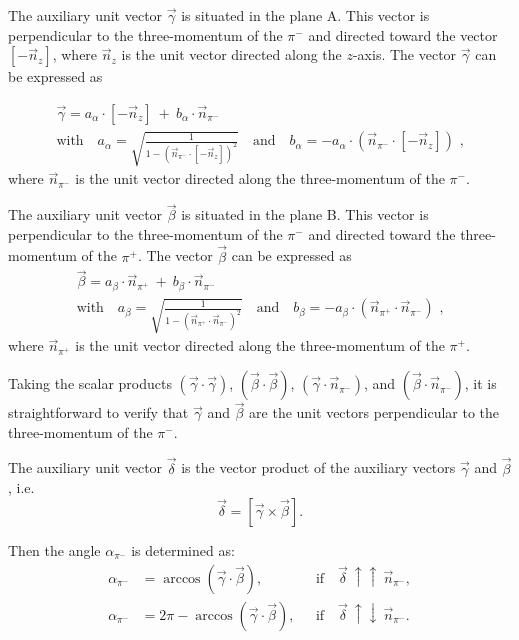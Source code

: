 The auxiliary unit vector $\vec \gamma$ is situated in the plane A. This vector is perpendicular to the three-momentum of the $\pi^{-}$ and directed toward the vector $[-\vec n_{z}]$, where $\vec n_{z}$ is the unit vector directed along the $z$-axis. The vector $\vec \gamma$ can be expressed as

\begin{gather*}
\vec \gamma = a_{\alpha}\cdot[-\vec n_{z}]~+~b_{\alpha}\cdot\vec n_{\pi^{-}}  \nonumber \\[10pt]
\text{with~~~}a_{\alpha}  =\sqrt{\frac{1}{1 - (\vec n_{\pi^{-}} \cdot [-\vec n_{z}] )^{2}}}  \text{~~~and~~~} \label{alphavec}
b_{\alpha}  = -  a_{\alpha}\cdot \left (\vec n_{\pi^{-}} \cdot [-\vec n_{z}] \right) \textrm{ ,} \nonumber
\end{gather*}
where $\vec n_{\pi^{-}}$ is the unit vector directed along the three-momentum of the $\pi^{-}$. 



The auxiliary unit vector $\vec \beta$ is situated in the plane B. This vector is perpendicular to the three-momentum of the $\pi^{-}$ and directed toward the three-momentum of the $\pi^{+}$. The vector $\vec \beta$ can be expressed as
\begin{gather*}
\vec \beta = a_{\beta}\cdot\vec n_{\pi^{+}}~+~b_{\beta}\cdot\vec n_{\pi^{-}}  \nonumber \\[10pt]  
\text{with~~~}a_{\beta} = \sqrt{\frac{1}{1 - (\vec n_{\pi^{+}} \cdot \vec n_{\pi^{-}})^{2}}} \text{~~~and~~~} \label{betavec}
b_{\beta} = -  a_{\beta}\cdot(\vec n_{\pi^{+}} \cdot \vec n_{\pi^{-}}) \textrm{ ,} \nonumber
\end{gather*} 
where $\vec n_{\pi^{+}}$ is the unit vector directed along the three-momentum of the $\pi^{+}$. 

Taking the scalar products $(\vec \gamma \cdot \vec  \gamma)$, $(\vec \beta \cdot \vec  \beta)$, $(\vec \gamma \cdot \vec n_{\pi^{-}})$, and $(\vec \beta \cdot \vec n_{\pi^{-}})$, it is straightforward to verify that $\vec \gamma$ and $\vec  \beta$ are the unit vectors perpendicular to the three-momentum of the $\pi^{-}$.

The auxiliary unit vector $\vec \delta$ is the vector product of the auxiliary vectors $\vec \gamma$ and $\vec \beta$, i.e. 
\begin{equation}
\vec \delta = [ \vec \gamma \times \vec \beta ].
\end{equation}

Then the angle $\alpha_{\pi^{-}}$ is determined as:
\begin{equation}
\begin{aligned}
\alpha_{\pi^{-}} &= \arccos(\vec \gamma \cdot \vec \beta),&\text{~~if~~~} \vec \delta~\uparrow\uparrow~\vec n_{\pi^{-}},\\
\alpha_{\pi^{-}} &= 2\pi - \arccos(\vec \gamma \cdot \vec \beta),&\text{~~if~~~} \vec \delta~\uparrow\downarrow~\vec n_{\pi^{-}}.    \label{eq:cr_sec_anglealpha}
\end{aligned}
\end{equation}

